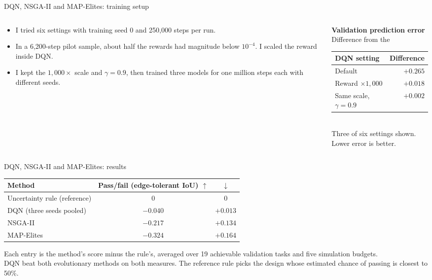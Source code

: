 \begin{frame}{DQN, NSGA-II and MAP-Elites: training setup}
  \begin{columns}[T]
    \begin{column}{0.5\textwidth}
      \begin{itemize}
        \item I tried six settings with training seed 0 and 250,000 steps per run.
        \item In a 6,200-step pilot sample, about half the rewards had magnitude below $10^{-4}$. I scaled the reward inside DQN.
        \item I kept the $1{,}000\times$ scale and $\gamma=0.9$, then trained three models for one million steps each with different seeds.
      \end{itemize}
    \end{column}
    \begin{column}{0.5\textwidth}
      \centering
      \small
      \textbf{Validation prediction error}\\
      Difference from the \\[0.6em]
      \begin{tabular}{@{}lr@{}}
        \toprule
        DQN setting & Difference \\
        \midrule
        Default & $+0.265$ \\
        Reward $\times 1{,}000$ & $+0.018$ \\
        Same scale, $\gamma=0.9$ & $+0.002$ \\
        \bottomrule
      \end{tabular}\\[0.4em]
      Three of six settings shown.\\
      Lower error is better.
    \end{column}
  \end{columns}
\end{frame}

\begin{frame}{DQN, NSGA-II and MAP-Elites: results}
  \centering
  \begin{tabular}{lcc}
    \toprule
    Method & Pass/fail (edge-tolerant IoU) $\uparrow$ & \prederr{} $\downarrow$ \\
    \midrule
    Uncertainty rule (reference) & $0$ & $0$ \\
    DQN (three seeds pooled) & $-0.040$ & $+0.013$ \\
    NSGA-II & $-0.217$ & $+0.134$ \\
    MAP-Elites & $-0.324$ & $+0.164$ \\
    \bottomrule
  \end{tabular}

  \vspace{1em}
  Each entry is the method's score minus the rule's, averaged over 19 achievable validation tasks and five simulation budgets.\\
  DQN beat both evolutionary methods on both measures. The reference rule picks the design whose estimated chance of passing is closest to 50\%.
\end{frame}


